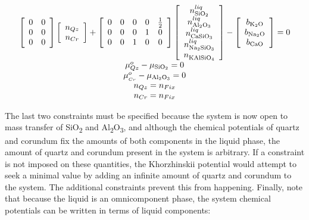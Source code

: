 \documentclass[11pt, titlepage, twoside]{article}
\begin{document}
\begin{MPEquation}[!ht]
\begin{equation}
\begin{array}{c}
\left[ {\begin{array}{*{20}{c}}
0&0\\
0&0\\
0&0
\end{array}} \right]\left[ {\begin{array}{*{20}{c}}
{{n_{Qz}}}\\
{{n_{Cr}}}
\end{array}} \right] + \left[ {\begin{array}{*{20}{c}}
0&0&0&0&{\frac{1}{2}}\\
0&0&0&1&0\\
0&0&1&0&0
\end{array}} \right]\left[ {\begin{array}{*{20}{c}}
{n_{{\rm{Si}}{{\rm{O}}_2}}^{liq}}\\
{n_{{\rm{A}}{{\rm{l}}_2}{{\rm{O}}_3}}^{liq}}\\
{n_{{\rm{CaSi}}{{\rm{O}}_3}}^{liq}}\\
{n_{{\rm{N}}{{\rm{a}}_2}{\rm{Si}}{{\rm{O}}_3}}^{liq}}\\
{n_{{\rm{KAlSi}}{{\rm{O}}_4}}^{}}
\end{array}} \right] - \left[ {\begin{array}{*{20}{c}}
{{b_{{{\rm{K}}_2}{\rm{O}}}}}\\
{{b_{{\rm{N}}{{\rm{a}}_2}{\rm{O}}}}}\\
{{b_{{\rm{CaO}}}}}
\end{array}} \right] = 0\\
\mu _{Qz}^o - {\mu _{{\rm{Si}}{{\rm{O}}_2}}} = 0\\
\mu _{_{Cr}}^o - {\mu _{{\rm{A}}{{\rm{l}}_2}{{\rm{O}}_3}}} = 0\\
n_{Qz} = n_{Fix}\\
n_{Cr} = n_{Fix}
\end{array}
\end{equation}
\label{MPEquationElement:0449FDED-5E78-465D-DD8C-A31F89E5D742}
\end{MPEquation}
The last two constraints must be specified because the system is now open to mass transfer of SiO\textsubscript{2} and Al\textsubscript{2}O\textsubscript{3}, and although the chemical potentials of quartz and corundum fix the amounts of both components in the liquid phase, the amount of quartz and corundum present in the system is arbitrary. If a constraint is not imposed on these quantities, the Khorzhinskii potential would attempt to seek a minimal value by adding an infinite amount of quartz and corundum to the system. The additional constraints prevent this from happening. Finally, note that because the liquid is an omnicomponent phase, the system chemical potentials can be written in terms of liquid components:
\end{document}
